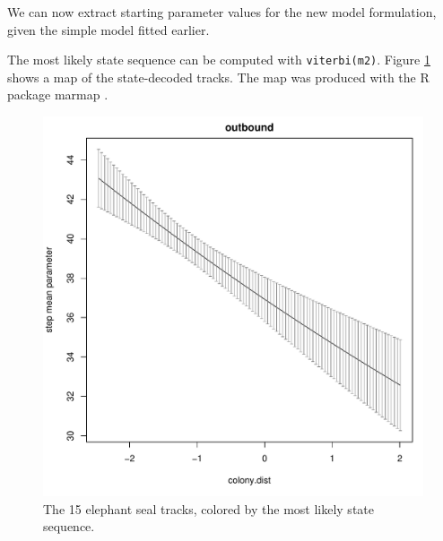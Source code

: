 \documentclass[12pt]{article}
\begin{document}
We can now extract starting parameter values for the new model formulation, given the simple model fitted earlier.

\begin{Schunk}
\end{Schunk}

The most likely state sequence can be computed with \verb|viterbi(m2)|. Figure \ref{fig:ses-results} shows a map of the state-decoded tracks. The map was produced with the R package marmap \citep{PanteSimonBouhet2013}.

\begin{figure}[htbp]
  \centering
  \includegraphics[width=\textwidth]{plot_sesResults}
  \caption{The 15 elephant seal tracks, colored by the most likely state sequence.}
  \label{fig:ses-results}
\end{figure}
\end{document}

